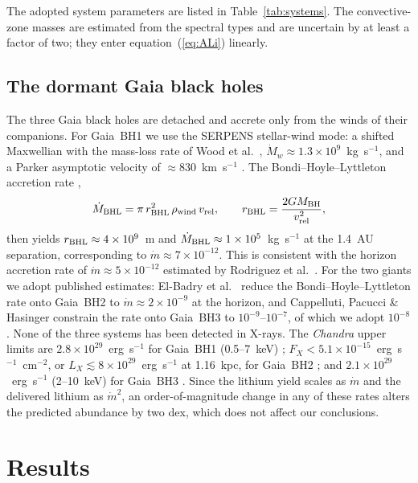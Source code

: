 \documentclass[twocolumn,showpacs,preprintnumbers,amsmath,amssymb]{revtex4}
\begin{document}
The adopted system parameters are listed in Table~\ref{tab:systems}. The convective-zone masses are estimated from the spectral types and are uncertain by at least a factor of two; they enter equation~(\ref{eq:ALi}) linearly.


\subsection{The dormant Gaia black holes}

The three Gaia black holes are detached and accrete only from the winds of their companions. For Gaia~BH1 we use the SERPENS stellar-wind mode: a shifted Maxwellian with the mass-loss rate of Wood et al.\ \cite{Wood_2005,Wood2014}, $\dot M_w \approx 1.3\times10^{9}$~kg~s$^{-1}$, and a Parker asymptotic velocity of $\approx 830$~km~s$^{-1}$ \cite{Parker_1958,LamersCassinelli_1999}. The Bondi--Hoyle--Lyttleton accretion rate \cite{Bondi1952,Edgar_2004},
\begin{equation}
\label{eq:bhl}
\dot{M}_{\rm BHL} = \pi\, r_{\rm BHL}^2\, \rho_{\rm wind}\, v_{\rm rel}, \qquad r_{\rm BHL} = \frac{2 G M_{\rm BH}}{v_{\rm rel}^2},
\end{equation}
then yields $r_{\rm BHL}\approx 4\times10^{9}$~m and $\dot M_{\rm BHL}\approx 1\times10^{5}$~kg~s$^{-1}$ at the 1.4~AU separation, corresponding to $\dot m \approx 7\times10^{-12}$. This is consistent with the horizon accretion rate of $\dot m\approx5\times10^{-12}$ estimated by Rodriguez et al.\ \cite{Rodriguez2024}. For the two giants we adopt published estimates: El-Badry et al.\ \cite{ElBadry2023BH2} reduce the Bondi--Hoyle--Lyttleton rate onto Gaia~BH2 to $\dot m\approx2\times10^{-9}$ at the horizon, and Cappelluti, Pacucci \& Hasinger \cite{Cappelluti2024} constrain the rate onto Gaia~BH3 to $10^{-9}$--$10^{-7}$, of which we adopt $10^{-8}$. None of the three systems has been detected in X-rays. The \emph{Chandra} upper limits are $2.8\times10^{29}$~erg~s$^{-1}$ for Gaia~BH1 (0.5--7~keV) \cite{Rodriguez2024}; $F_X<5.1\times10^{-15}$~erg~s$^{-1}$~cm$^{-2}$, or $L_X\lesssim8\times10^{29}$~erg~s$^{-1}$ at 1.16~kpc, for Gaia~BH2 \cite{ElBadry2023BH2}; and $2.1\times10^{29}$~erg~s$^{-1}$ (2--10~keV) for Gaia~BH3 \cite{Cappelluti2024}. Since the lithium yield scales as $\dot m$ and the delivered lithium as $\dot m^2$, an order-of-magnitude change in any of these rates alters the predicted abundance by two dex, which does not affect our conclusions.


\section{\label{sec:results} Results}
\end{document}
